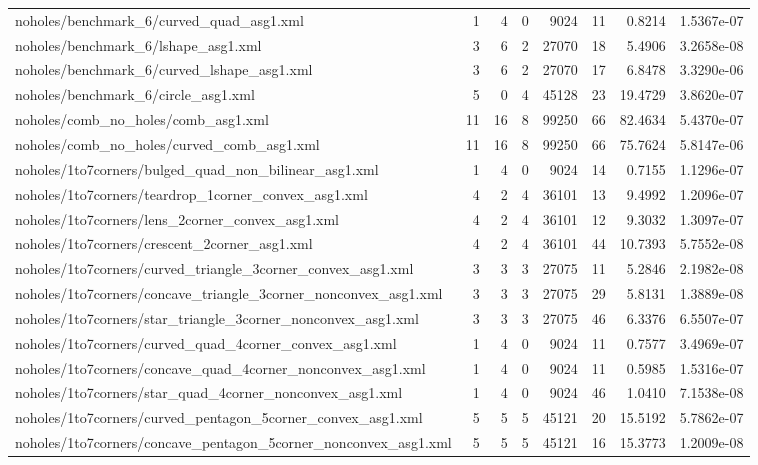 \documentclass[11pt,a4paper]{article}
\begin{document}
\begin{longtable}{>{\ttfamily\scriptsize\raggedright\arraybackslash}p{8.4cm}rrrrrrr}
noholes/benchmark\_6/curved\_quad\_asg1.xml & 1 & 4 & 0 & 9024 & 11 & 0.8214 & 1.5367e-07 \\
noholes/benchmark\_6/lshape\_asg1.xml & 3 & 6 & 2 & 27070 & 18 & 5.4906 & 3.2658e-08 \\
noholes/benchmark\_6/curved\_lshape\_asg1.xml & 3 & 6 & 2 & 27070 & 17 & 6.8478 & 3.3290e-06 \\
noholes/benchmark\_6/circle\_asg1.xml & 5 & 0 & 4 & 45128 & 23 & 19.4729 & 3.8620e-07 \\
noholes/comb\_no\_holes/comb\_asg1.xml & 11 & 16 & 8 & 99250 & 66 & 82.4634 & 5.4370e-07 \\
noholes/comb\_no\_holes/curved\_comb\_asg1.xml & 11 & 16 & 8 & 99250 & 66 & 75.7624 & 5.8147e-06 \\
noholes/1to7corners/bulged\_quad\_non\_bilinear\_asg1.xml & 1 & 4 & 0 & 9024 & 14 & 0.7155 & 1.1296e-07 \\
noholes/1to7corners/teardrop\_1corner\_convex\_asg1.xml & 4 & 2 & 4 & 36101 & 13 & 9.4992 & 1.2096e-07 \\
noholes/1to7corners/lens\_2corner\_convex\_asg1.xml & 4 & 2 & 4 & 36101 & 12 & 9.3032 & 1.3097e-07 \\
noholes/1to7corners/crescent\_2corner\_asg1.xml & 4 & 2 & 4 & 36101 & 44 & 10.7393 & 5.7552e-08 \\
noholes/1to7corners/curved\_triangle\_3corner\_convex\_asg1.xml & 3 & 3 & 3 & 27075 & 11 & 5.2846 & 2.1982e-08 \\
noholes/1to7corners/concave\_triangle\_3corner\_nonconvex\_asg1.xml & 3 & 3 & 3 & 27075 & 29 & 5.8131 & 1.3889e-08 \\
noholes/1to7corners/star\_triangle\_3corner\_nonconvex\_asg1.xml & 3 & 3 & 3 & 27075 & 46 & 6.3376 & 6.5507e-07 \\
noholes/1to7corners/curved\_quad\_4corner\_convex\_asg1.xml & 1 & 4 & 0 & 9024 & 11 & 0.7577 & 3.4969e-07 \\
noholes/1to7corners/concave\_quad\_4corner\_nonconvex\_asg1.xml & 1 & 4 & 0 & 9024 & 11 & 0.5985 & 1.5316e-07 \\
noholes/1to7corners/star\_quad\_4corner\_nonconvex\_asg1.xml & 1 & 4 & 0 & 9024 & 46 & 1.0410 & 7.1538e-08 \\
noholes/1to7corners/curved\_pentagon\_5corner\_convex\_asg1.xml & 5 & 5 & 5 & 45121 & 20 & 15.5192 & 5.7862e-07 \\
noholes/1to7corners/concave\_pentagon\_5corner\_nonconvex\_asg1.xml & 5 & 5 & 5 & 45121 & 16 & 15.3773 & 1.2009e-08 \\

\end{longtable}
\end{document}
